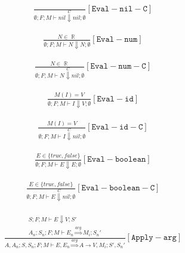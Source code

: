 \documentclass{scrartcl}
\DeclareMathOperator{\numtype}{\mathbb{R}}
\begin{document}
    \begin{align*}
    \frac{}{
        \emptyset; F; M \vdash nil \overset{C}{\Downarrow} nil; \emptyset
    }[\mathtt{Eval-nil-C}]
    \end{align*}
    
    \begin{align*}
    \frac{
        N \in \numtype
    }{
        \emptyset; F; M \vdash N \Downarrow N; \emptyset
    }[\mathtt{Eval-num}]
    \end{align*}
    
    \begin{align*}
    \frac{
        N \in \numtype
    }{
        \emptyset; F; M \vdash N \overset{C}{\Downarrow} nil; \emptyset
    }[\mathtt{Eval-num-C}]
    \end{align*}

    \begin{align*}
    \frac{
        M(I) = V
    }{
        \emptyset; F; M \vdash I \Downarrow V; \emptyset
    }[\mathtt{Eval-id}]
    \end{align*}
    
    \begin{align*}
    \frac{
        M(I) = V
    }{
        \emptyset; F; M \vdash I \overset{C}{\Downarrow} nil; \emptyset
    }[\mathtt{Eval-id-C}]
    \end{align*}
    
    \begin{align*}
    \frac{
        E \in \{true, false\}
    }{
        \emptyset; F; M \vdash E \Downarrow E; \emptyset
    }[\mathtt{Eval-boolean}]
    \end{align*}
    
    \begin{align*}
    \frac{
        E \in \{true, false\}
    }{
        \emptyset; F; M \vdash E \overset{C}{\Downarrow} nil; \emptyset
    }[\mathtt{Eval-boolean-C}]
    \end{align*}
    
    \begin{align*}
    \frac{
        \begin{matrix}
        S; F; M \vdash E \Downarrow V; S' \\
        A_n; S_n; F; M \vdash E_n \overset{arg}{\Rightarrow} M_i; S_n'
        \end{matrix}
    }{
        A, A_n; S, S_n; F; M \vdash E, E_n \overset{arg}{\Rightarrow} A \to V, M_i; S', S_n'
    }[\mathtt{Apply-arg}]
    \end{align*}
    
\end{document}
